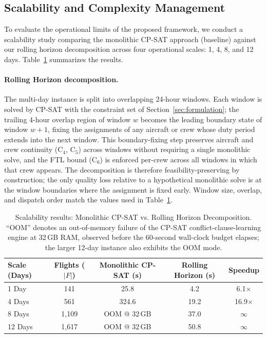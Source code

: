 \documentclass[12pt,number]{elsarticle}
\begin{document}
\subsection{Scalability and Complexity Management}
\label{sec:scalability}

To evaluate the operational limits of the proposed framework, we conduct a scalability study comparing the monolithic CP-SAT approach (baseline) against our rolling horizon decomposition across four operational scales: 1, 4, 8, and 12 days. Table~\ref{tab:scale} summarizes the results.

\paragraph*{Rolling Horizon decomposition.} The multi-day instance is split into overlapping 24-hour windows. Each window is solved by CP-SAT with the constraint set of Section~\ref{sec:formulation}; the trailing 4-hour overlap region of window $w$ becomes the leading boundary state of window $w+1$, fixing the assignments of any aircraft or crew whose duty period extends into the next window. This boundary-fixing step preserves aircraft and crew continuity (C$_4$, C$_5$) across windows without requiring a single monolithic solve, and the FTL bound (C$_6$) is enforced per-crew across all windows in which that crew appears. The decomposition is therefore feasibility-preserving by construction; the only quality loss relative to a hypothetical monolithic solve is at the window boundaries where the assignment is fixed early. Window size, overlap, and dispatch order match the values used in Table~\ref{tab:scale}.

\begin{table}[H]
\centering
\caption{Scalability results: Monolithic CP-SAT vs. Rolling Horizon Decomposition. ``OOM'' denotes an out-of-memory failure of the CP-SAT conflict-clause-learning engine at 32\,GB RAM, observed before the 60-second wall-clock budget elapses; the larger 12-day instance also exhibits the OOM mode.}
\label{tab:scale}
\small
\begin{tabular}{@{}lcccc@{}}
\toprule
\textbf{Scale (Days)} & \textbf{Flights ($|F|$)} & \textbf{Monolithic CP-SAT (s)} & \textbf{Rolling Horizon (s)} & \textbf{Speedup} \\
\midrule
1 Day  & 141  & 25.8  & 4.2  & 6.1$\times$ \\
4 Days & 561  & 324.6 & 19.2 & 16.9$\times$ \\
8 Days & 1{,}109 & OOM @ 32\,GB & 37.0 & $\infty$ \\
12 Days & 1{,}617 & OOM @ 32\,GB & 50.8 & $\infty$ \\
\bottomrule
\end{tabular}
\end{table}
\end{document}

